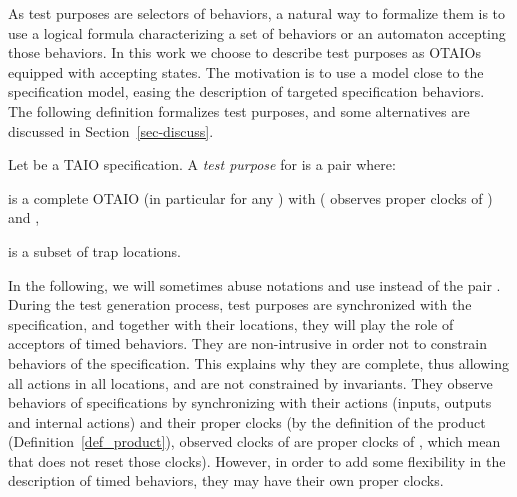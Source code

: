 \documentclass{LMCS}
\theoremstyle{plain}\newtheorem{proposition}[thm]{Proposition}
\begin{document}
As test purposes are selectors of behaviors, 
a natural way to formalize them is to use a logical formula
characterizing a set of behaviors 
or an automaton accepting those behaviors.
In this work we choose to describe test purposes as OTAIOs equipped 
with accepting states.
The motivation is to use a model close to the specification model,
easing the description of targeted specification behaviors.
The following definition formalizes test purposes, 
and some alternatives are discussed in Section~\ref{sec-discuss}. 

\begin{defi}
 Let   be a TAIO specification.
 A {\em test purpose} for  is a pair
   where:
\begin{iteMize}{}
\item  is a complete OTAIO (in
  particular  for any ) with
   ( observes proper clocks of ) and
  ,
\item
   is a subset of trap locations.
\end{iteMize}
\end{defi}

In the following, we will sometimes abuse notations and use 
instead of the pair .  During the test generation
process, test purposes are synchronized with the specification, and
together with their  locations, they will play the role of
acceptors of timed behaviors.  They are non-intrusive in order not to
constrain behaviors of the specification.  This explains why they are
complete, thus allowing all actions in all locations, and are not
constrained by invariants.  They observe behaviors of specifications
by synchronizing with their actions (inputs, outputs and internal
actions) and their proper clocks (by the definition of 
the product (Definition~\ref{def_product}), observed clocks of
 are proper clocks of , which mean that  does not reset
those clocks).  However, in order to add some flexibility in the
description of timed behaviors, they may have their own proper clocks.
\end{document}
